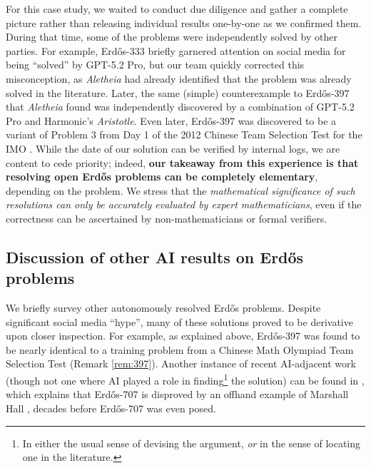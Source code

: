 \documentclass{article}
\theoremstyle{plain}
\theoremstyle{definition}
\newcommand{\Aletheia}{\emph{Aletheia}}
\begin{document}
For this case study, we waited to conduct due diligence and gather a complete picture rather than releasing individual results one-by-one as we confirmed them. During that time, some of the problems were independently solved by other parties. For example, Erd\H{o}s-333 briefly garnered attention on social media for being ``solved'' by GPT-5.2 Pro, but our team quickly corrected this misconception, as {\Aletheia} had already identified that the problem was already solved in the literature. Later, the same (simple) counterexample to Erd\H{o}s-397 that {\Aletheia} found was independently discovered by a combination of GPT-5.2 Pro and Harmonic's \emph{Aristotle}. Even later, Erd\H{o}s-397 was discovered to be a variant of Problem 3 from Day 1 of the 2012 Chinese Team Selection Test for the IMO \cite{AoPS12}. While the date of our solution can be verified by internal logs, we are content to cede priority; indeed, \textbf{our takeaway from this experience is that resolving open Erd\H{o}s problems can be completely elementary}, depending on the problem. We stress that the \emph{mathematical significance of such resolutions can only be accurately evaluated by expert mathematicians}, even if the correctness can be ascertained by non-mathematicians or formal verifiers.  


\subsection{Discussion of other AI results on Erd\H{o}s problems}
We briefly survey other autonomously resolved Erd\H{o}s problems. Despite significant social media ``hype'', many of these solutions proved to be derivative upon closer inspection. For example, as explained above, Erdős-397 was found to be nearly identical to a training problem from a Chinese Math Olympiad Team Selection Test (Remark \ref{rem:397}). Another instance of recent AI-adjacent work (though not one where AI played a role in finding\footnote{In either the usual sense of devising the argument, \emph{or} in the sense of locating one in the literature.} the solution) can be found in \cite{alexeev2025forbidden}, which explains that Erd\H{o}s-707 is disproved by an offhand example of Marshall Hall \cite{Hall47}, decades before Erd\H{o}s-707 was even posed. 
\end{document}
